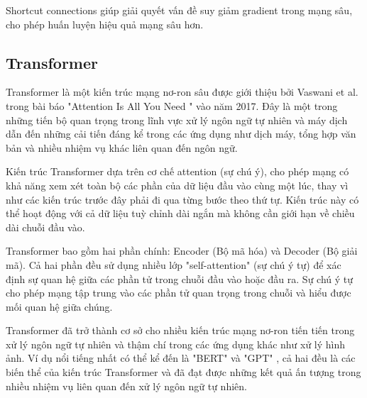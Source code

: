 Shortcut connections giúp giải quyết vấn đề suy giảm gradient trong mạng sâu, cho phép huấn luyện hiệu quả mạng sâu hơn.

\subsection{Transformer}
Transformer là một kiến trúc mạng nơ-ron sâu được giới thiệu bởi Vaswani et al. trong bài báo "Attention Is All You Need \cite{vaswani2023attention}" vào năm 2017. Đây là một trong những tiến bộ quan trọng trong lĩnh vực xử lý ngôn ngữ tự nhiên và máy dịch dẫn đến những cải tiến đáng kể trong các ứng dụng như dịch máy, tổng hợp văn bản và nhiều nhiệm vụ khác liên quan đến ngôn ngữ.

Kiến trúc Transformer dựa trên cơ chế attention (sự chú ý), cho phép mạng có khả năng xem xét toàn bộ các phần của dữ liệu đầu vào cùng một lúc, thay vì như các kiến trúc trước đây phải đi qua từng bước theo thứ tự. Kiến trúc này có thể hoạt động với cả dữ liệu tuỳ chỉnh dài ngắn mà không cần giới hạn về chiều dài chuỗi đầu vào.

Transformer bao gồm hai phần chính: Encoder (Bộ mã hóa) và Decoder (Bộ giải mã). Cả hai phần đều sử dụng nhiều lớp "self-attention" (sự chú ý tự) để xác định sự quan hệ giữa các phần tử trong chuỗi đầu vào hoặc đầu ra. Sự chú ý tự cho phép mạng tập trung vào các phần tử quan trọng trong chuỗi và hiểu được mối quan hệ giữa chúng.

Transformer đã trở thành cơ sở cho nhiều kiến trúc mạng nơ-ron tiến tiến trong xử lý ngôn ngữ tự nhiên và thậm chí trong các ứng dụng khác như xử lý hình ảnh. Ví dụ nổi tiếng nhất có thể kể đến là "BERT" và "GPT" , cả hai đều là các biến thể của kiến trúc Transformer và đã đạt được những kết quả ấn tượng trong nhiều nhiệm vụ liên quan đến xử lý ngôn ngữ tự nhiên.

